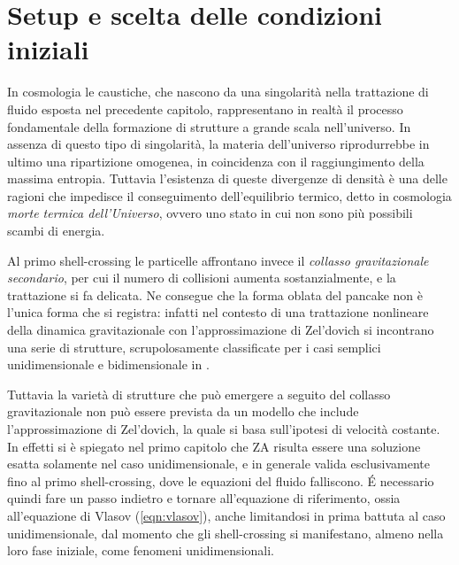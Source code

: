 \section{Setup e scelta delle condizioni iniziali}

In cosmologia le caustiche, che nascono da una singolarità nella trattazione di fluido esposta nel precedente
capitolo, rappresentano in realtà il processo fondamentale della formazione di strutture a grande scala 
nell'universo. In assenza di questo tipo di singolarità, la materia dell'universo riprodurrebbe in ultimo una
ripartizione omogenea, in coincidenza con il raggiungimento della massima entropia. Tuttavia l'esistenza di queste
divergenze di densità è una delle ragioni che impedisce il conseguimento dell'equilibrio termico, detto in cosmologia \textit{morte termica dell'Universo},
ovvero uno stato in cui non sono più possibili scambi di energia. 

Al primo shell-crossing le particelle affrontano invece il \textit{collasso gravitazionale
secondario}, per cui il numero di collisioni aumenta sostanzialmente, e la trattazione si fa delicata. 
Ne consegue che la forma oblata del pancake non è l'unica forma che si 
registra: infatti nel contesto di una trattazione nonlineare della dinamica gravitazionale con l'approssimazione
di Zel'dovich si incontrano una serie di strutture, scrupolosamente classificate per i casi semplici unidimensionale
e bidimensionale in \cite{arnold}.

Tuttavia la varietà di strutture che può emergere a seguito del collasso gravitazionale non può essere prevista
da un modello che include l'approssimazione di Zel'dovich, la quale si basa sull'ipotesi di velocità costante.
In effetti si è spiegato nel primo capitolo che ZA risulta essere una soluzione esatta solamente nel caso 
unidimensionale, e in generale valida esclusivamente fino al primo shell-crossing, dove le equazioni del
fluido falliscono. \'E necessario quindi fare un passo indietro e tornare all'equazione di riferimento, ossia all'equazione di Vlasov 
(\ref{eqn:vlasov}), anche limitandosi in prima battuta al caso unidimensionale, dal momento che gli 
shell-crossing si manifestano, almeno nella loro fase iniziale, come fenomeni unidimensionali.


